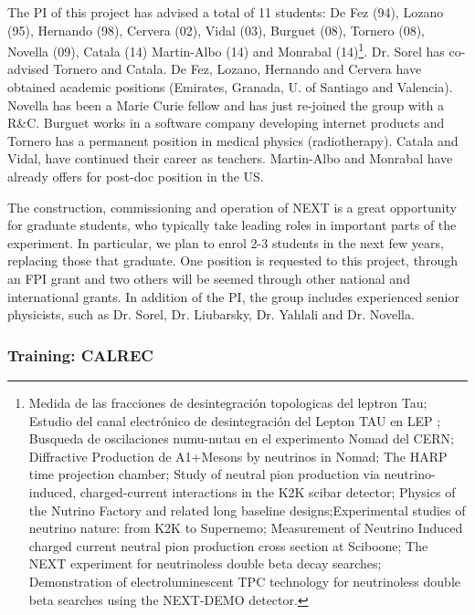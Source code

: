 The PI of this project has advised a total of 11 students: De Fez (94), Lozano (95), Hernando (98), Cervera (02), Vidal (03), Burguet (08), Tornero (08), Novella (09), Catala (14) Martin-Albo (14) and Monrabal (14)\footnote{Medida de las fracciones de desintegración topologicas del leptron Tau; Estudio del canal electrónico de desintegración del Lepton TAU en LEP ; Busqueda de oscilaciones numu-nutau en el experimento Nomad del CERN; Diffractive Production de A1+Mesons by neutrinos in Nomad; The HARP time projection chamber; Study of neutral pion production via neutrino-induced, charged-current interactions in the K2K scibar detector; Physics of the Nutrino Factory and related long baseline designs;Experimental studies of neutrino nature: from K2K to Supernemo; Measurement of Neutrino Induced charged current neutral pion production cross section at Sciboone; The NEXT experiment for neutrinoless double beta decay searches; Demonstration of electroluminescent TPC technology for neutrinoless double beta searches using the NEXT-DEMO detector.}. Dr. Sorel has co-advised Tornero and Catala. De Fez, Lozano, Hernando and Cervera have obtained academic positions (Emirates, Granada, U. of Santiago and Valencia). Novella has been a Marie Curie fellow and has just re-joined the group with a R\&C. Burguet works in a software company developing internet products and Tornero has a permanent position in medical physics (radiotherapy). Catala and Vidal, have continued their career as teachers. Martin-Albo and Monrabal have already offers for post-doc position in the US.

The construction, commissioning and operation of NEXT is a great opportunity for graduate students, who typically take leading roles in important parts of the experiment. In particular, we plan to enrol 2-3 students in the next few years, replacing those that graduate. One position is requested to this project, through an FPI grant and two others will be seemed through other national and international grants. In addition of the PI, the group includes experienced senior physicists, such as Dr. Sorel, Dr. Liubarsky, Dr. Yahlali and Dr. Novella. 

\subsubsection*{Training: CALREC}

